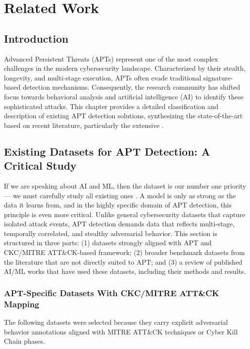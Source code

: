 \chapter{Related Work}

\label{chap:related}

\section{Introduction}

Advanced Persistent Threats (APTs) represent one of the most complex challenges in the modern cybersecurity landscape. Characterized by their stealth, longevity, and multi-stage execution, APTs often evade traditional signature-based detection mechanisms. Consequently, the research community has shifted focus towards behavioral analysis and artificial intelligence (AI) to identify these sophisticated attacks. This chapter provides a detailed classification and description of existing APT detection solutions, synthesizing the state-of-the-art based on recent literature, particularly the extensive \cite{ankalaki2025cyber}. 
\section{Existing Datasets for APT Detection: A Critical Study}

If we are speaking about AI and ML, then the dataset is our number one priority --- we must carefully study all existing ones . A model is only as strong as the data it learns from, and in the highly specific domain of APT detection, this principle is even more critical. Unlike general cybersecurity datasets that capture isolated attack events, APT detection demands data that reflects multi-stage, temporally correlated, and stealthy adversarial behavior. This section is structured in three parts: (1) datasets strongly aligned with APT and CKC/MITRE ATT\&CK-based framework; (2) broader benchmark datasets from the literature that are not directly suited to APT; and (3) a review of published AI/ML works that have used these datasets, including their methods and results.

\subsection{APT-Specific Datasets With CKC/MITRE ATT\&CK Mapping}

The following datasets were selected because they carry explicit adversarial behavior annotations aligned with MITRE ATT\&CK techniques or Cyber Kill Chain phases.

